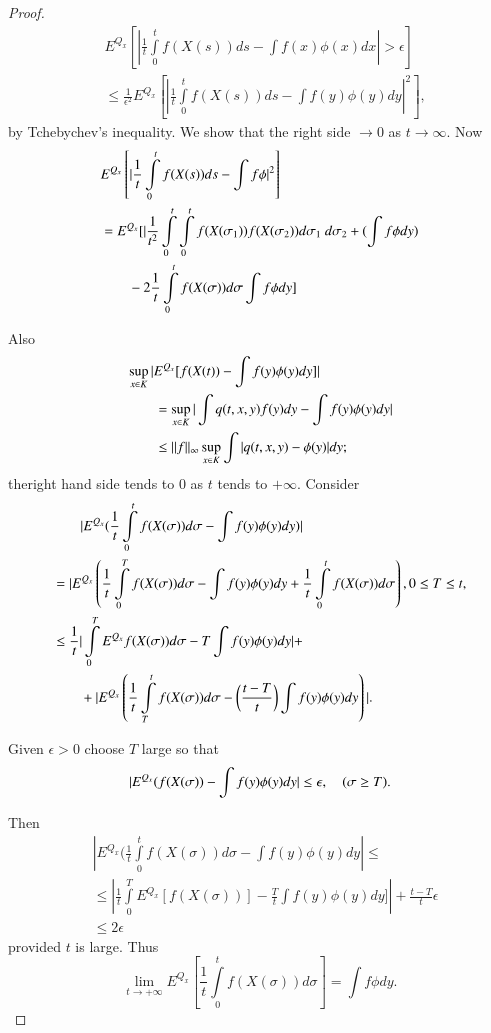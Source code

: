 \begin{proof}
\begin{align*}
& E^{Q_{x}}\left[|\frac{1}{t}\int\limits^{t}_{0}f(X(s))ds-\int
    f(x)\phi(x)dx|>\epsilon\right]\\ 
& \leq
  \frac{1}{\epsilon^{2}}E^{Q_{x}}\left[|\frac{1}{t}\int\limits^{t}_{0}f(X(s))ds-\int
    f(y)\phi(y)dy|^{2}\right], 
\end{align*}
by Tchebychev's inequality. We show that the right side $\to 0$ as
$t\to \infty$. Now
\begin{align*}
& E^{Q_{x}} \left[|\frac{1}{t}\int\limits^{t}_{0}f(X(s))ds-\int
  f\phi|^{2}\right]\\
&
  =E^{Q_{x}}[|\frac{1}{t^{2}}\int\limits^{t}_{0}\int\limits^{t}_{0}f(X(\sigma_{1}))f(X(\sigma_{2}))d\sigma_{1}\ d\sigma_{2}+(\int
    f\phi dy)\\
&\qq -2\frac{1}{t}\int\limits^{t}_{0}f(X(\sigma))d\sigma\int f\phi dy]
\end{align*}

Also
\begin{align*}
& \sup\limits_{x\in K}|E^{Q_{x}}[f(X(t))-\int f(y)\phi(y)dy]|\\
&\qquad =\sup\limits_{x\in K}|\int q(t,x,y)f(y)dy-\int f(y)\phi(y)dy|\\
&\qquad \leq ||f||_{\infty}\sup\limits_{x\in K}\int |q(t,x,y)-\phi(y)|dy;
\end{align*}
the\pageoriginale right hand side tends to $0$ as $t$ tends to
$+\infty$. Consider
{\fontsize{10pt}{12pt}\selectfont
\begin{align*}
&\qquad |E^{Q_{x}}(\frac{1}{t}\int\limits^{t}_{0}f(X(\sigma))d\sigma-\int
f(y)\phi(y)dy)|\\
&= |E^{Q_{x}}\left(\frac{1}{t}\int\limits^{T}_{0}f(X(\sigma))d\sigma-\int
f(y)\phi(y)dy+\frac{1}{t}\int\limits^{t}_{0}f(X(\sigma))d\sigma\right),0\leq
T\leq t,\\
&\leq
\frac{1}{t}|\int\limits^{T}_{0}E^{Q_{x}}f(X(\sigma))d\sigma-T\int
f(y)\phi(y)dy|+\\
&\qquad
+|E^{Q_{x}}\left(\frac{1}{t}\int\limits^{t}_{T}f(X(\sigma))d\sigma-\left(\frac{t-T}{t}\right)\int
f(y)\phi(y)dy\right)|. 
\end{align*}}

Given $\epsilon>0$ choose $T$ large so that
$$
|E^{Q_{x}}(f(X(\sigma))-\int f(y)\phi(y)dy|\leq \epsilon,\quad (\sigma
\geq T).
$$

Then
\begin{align*}
& |E^{Q_{x}}\Big(\frac{1}{t}\int\limits^{t}_{0}f(X(\sigma))d\sigma-\int
f(y)\phi(y)dy|\leq\\
&\leq
|\frac{1}{t}\int\limits^{T}_{0}E^{Q_{x}}[f(X(\sigma))]-\frac{T}{t}\int
f(y)\phi(y)dy]|+\frac{t-T}{t}\epsilon\\
&\leq 2\epsilon 
\end{align*}
provided $t$ is large. Thus
$$
\lim\limits_{t\to
  +\infty}E^{Q_{x}}[\frac{1}{t}\int\limits^{t}_{0}f(X(\sigma))d\sigma]=\int
f\phi dy.
$$


\end{proof}

